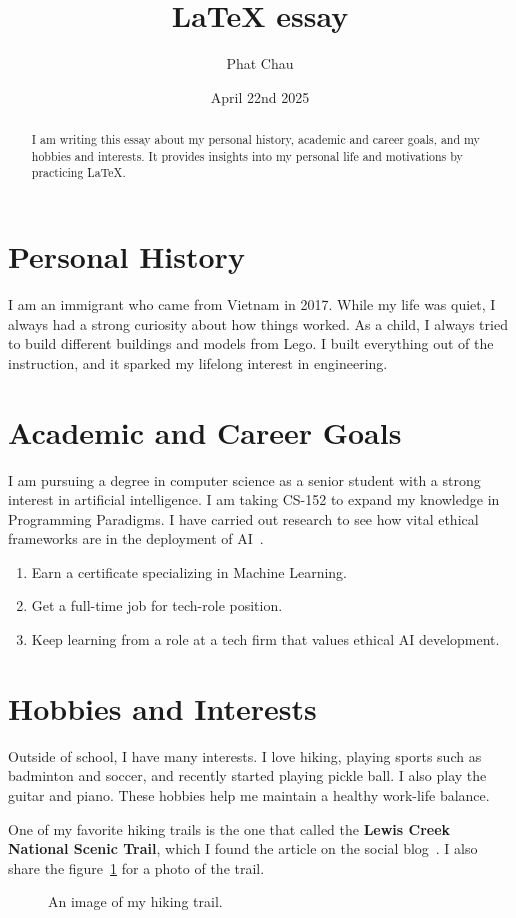\documentclass{article}
\title{LaTeX essay}
\author{Phat Chau}
\date{April 22nd 2025}
\begin{document}
\maketitle
\begin{abstract}
I am writing this essay about my personal history, academic and career goals, and my hobbies and interests. It provides insights into my personal life and motivations by practicing LaTeX.
\end{abstract}
    
\section{Personal History}
I am an immigrant who came from Vietnam in 2017. While my life was quiet, I always had a strong curiosity about how things worked. As a child, I always tried to build different buildings and models from Lego. I built everything out of the instruction, and it sparked my lifelong interest in engineering.
    
\section{Academic and Career Goals}
I am pursuing a degree in computer science as a senior student with a strong interest in artificial intelligence. I am taking CS-152 to expand my knowledge in Programming Paradigms. I have carried out research to see how vital ethical frameworks are in the deployment of AI~\cite{DBLP:journals/access/NetturKNG25}.
    
\begin{enumerate}[label=\arabic*.]
    \item Earn a certificate specializing in Machine Learning.
    \item Get a full-time job for tech-role position.
    \item Keep learning from a role at a tech firm that values ethical AI development.
\end{enumerate}
    
    
\section{Hobbies and Interests}
Outside of school, I have many interests. I love hiking, playing sports such as badminton and soccer, and recently started playing pickle ball. I also play the guitar and piano. These hobbies help me maintain a healthy work-life balance.

One of my favorite hiking trails is the one that called the \textbf{Lewis Creek National Scenic Trail}, which I found the article on the social blog~\cite{Gorgeous-Day-Hikes-in-California's-Sierra-Mountains}. I also share the figure~\ref{fig:loop} for a photo of the trail.

\begin{figure}[h]
  \centering
  \caption{An image of my hiking trail.}
  \label{fig:loop}
\end{figure}

\newpage



\end{document}
